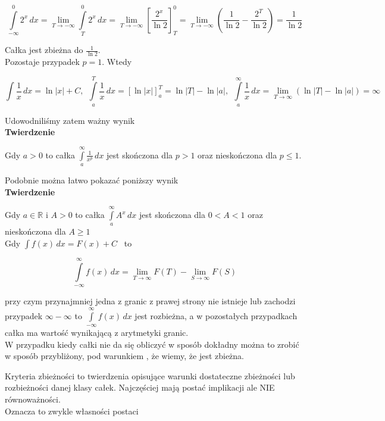 \documentclass[12pt]{article}
\begin{document}
$$ \int\limits_{-\infty}^{0} 2^x \,dx = \lim_{T \to -\infty} \int\limits_{T}^{0} 2^x \,dx = 
\lim_{T \to -\infty} \left[ \frac{2^x}{\ln 2} \right]_T^0 = \lim_{T \to -\infty} 
\left( \frac{1}{\ln 2} - \frac{2^T}{\ln 2} \right) = \frac{1}{\ln 2} $$

Całka jest zbieżna do $ \frac{1}{\ln 2} $. \\

Pozostaje przypadek $ p = 1 $. Wtedy

$$ \int \frac{1}{x} \,dx = \ln |x| + C, \ \
\int\limits_{a}^{T} \frac{1}{x} \,dx = [\ln |x|]_a^T = \ln |T| - \ln |a|, \ \
\int\limits_{a}^{\infty} \frac{1}{x} \,dx = \lim_{T \to \infty} (\ln |T| - \ln |a|) = \infty $$

Udowodniliśmy zatem ważny wynik \\

\textbf{Twierdzenie} 

Gdy $ a > 0 $ to całka $ \int\limits_{a}^{\infty} \frac{1}{x^p} \,dx $
jest skończona dla $ p > 1 $ oraz nieskończona dla $ p \leq 1 $.

Podobnie można łatwo pokazać poniższy wynik \\

\textbf{Twierdzenie}

Gdy $ a \in \mathbb{R} $ i $ A > 0 $ to całka $ \int\limits_{a}^{\infty} A^x \,dx $
jest skończona dla $ 0 < A < 1 $ oraz nieskończona \linebreak dla $ A \geq 1 $ \\

Gdy $ \int f(x) \,dx = F(x) + C $ \ to

$$ \int\limits_{-\infty}^{\infty} f(x) \, dx = \lim_{T \to \infty} F(T) - \lim_{S \to \infty} F(S) $$

przy czym przynajmniej jedna z granic z prawej strony nie istnieje lub zachodzi przypadek 
$ \infty - \infty $ to $ \int\limits_{-\infty}^{\infty} f(x) \,dx $ jest rozbieżna, a w pozostałych
przypadkach całka ma wartość wynikającą z arytmetyki granic. \\

W przypadku kiedy całki nie da się obliczyć w sposób dokładny można to zrobić w sposób przybliżony, pod warunkiem
, że wiemy, że jest zbieżna.

Kryteria zbieżności to twierdzenia opisujące warunki dostateczne zbieżności lub rozbieżności danej klasy
całek. Najczęściej mają postać implikacji ale NIE równoważności. \\

Oznacza to zwykle własności postaci
\end{document}
